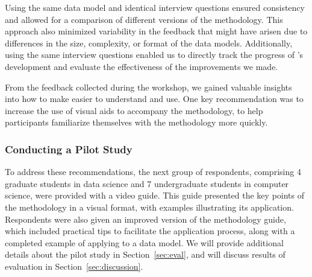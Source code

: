 Using the same data model and identical interview questions ensured consistency and allowed for a comparison of different versions of the methodology. This approach also minimized variability in the feedback that might have arisen due to differences in the size, complexity, or format of the data models. Additionally, using the same interview questions enabled us to directly track the progress of \credal's development and evaluate the effectiveness of the improvements we made.

From the feedback collected during the workshop, we gained valuable insights into how to make \credal easier to understand and use.
One key recommendation was to increase the use of visual aids to accompany the methodology, to help participants familiarize themselves with the methodology more quickly.

\subsubsection{Conducting a Pilot Study}  
\label{sec:credal:refine:3}

To address these recommendations, the next group of respondents, comprising 4 graduate students in data science and 7 undergraduate students in computer science, were provided with a video guide. This guide presented the key points of the methodology in a visual format, with examples illustrating its application. Respondents were also given an improved version of the methodology guide, which included practical tips to facilitate the application process, along with a completed example of applying \credal to a data model.  We will provide additional details about the pilot study in Section~\ref{sec:eval}, and will discuss results of evaluation in Section~\ref{sec:discussion}.